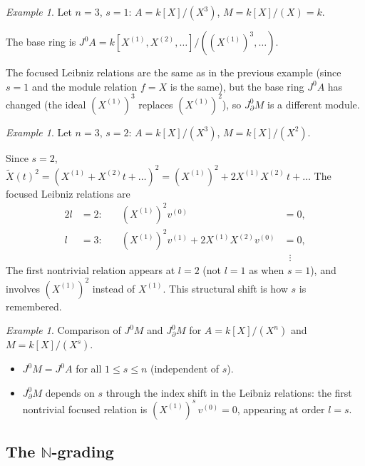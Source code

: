 \documentclass[a4paper, 12pt]{amsart}
\theoremstyle{definition}
\theoremstyle{remark}
\newtheorem{example}[theorem]{Example}
\begin{document}
\begin{example}
  \label{exa:focused-n3-s1}
  Let $n = 3$, $s = 1$: $A = k[X]/(X^3)$, $M = k[X]/(X) = k$.

  \noindent
  The base ring is $J^0A = k[X^{(1)}, X^{(2)}, \dots]/((X^{(1)})^3, \dots)$.

  \noindent
  The focused Leibniz relations are the same as in the previous example
  (since $s = 1$ and the module relation $f = X$ is the same),
  but the base ring $J^0A$ has changed
  (the ideal $(X^{(1)})^3$ replaces $(X^{(1)})^2$),
  so $J^0_\partial M$ is a different module.
\end{example}

\begin{example}
  \label{exa:focused-n3-s2}
  Let $n = 3$, $s = 2$: $A = k[X]/(X^3)$, $M = k[X]/(X^2)$.

  \noindent
  Since $s = 2$,
  $\widetilde{X}(t)^2 = (X^{(1)} + X^{(2)}t + \dots)^2 = (X^{(1)})^2 + 2X^{(1)}X^{(2)}\,t + \dots$
  The focused Leibniz relations are
  \begin{alignat*}{2}
    l &= 2: &\quad (X^{(1)})^2 v^{(0)} &= 0, \\
    l &= 3: &\quad (X^{(1)})^2 v^{(1)} + 2X^{(1)}X^{(2)} v^{(0)} &= 0, \\
      &  &\quad &\;\;\vdots
  \end{alignat*}
  The first nontrivial relation appears at $l = 2$ (not $l = 1$ as when $s = 1$),
  and involves $(X^{(1)})^2$ instead of $X^{(1)}$.
  This structural shift is how $s$ is remembered.
\end{example}

\begin{example}
  \label{exa:focused-comparison}
  Comparison of $J^0M$ and $J^0_\partial M$ for $A = k[X]/(X^n)$ and $M = k[X]/(X^s)$.
  \begin{itemize}
  \item
    $J^0M = J^0A$ for all $1 \le s \le n$ (independent of $s$).
  \item
    $J^0_\partial M$ depends on $s$ through the index shift in the Leibniz relations:
    the first nontrivial focused relation is
    $(X^{(1)})^s\, v^{(0)} = 0$,
    appearing at order $l = s$.
  \end{itemize}
\end{example}

\subsection{The $\mathbb{N}$-grading}
\label{sec:grading}
\end{document}
